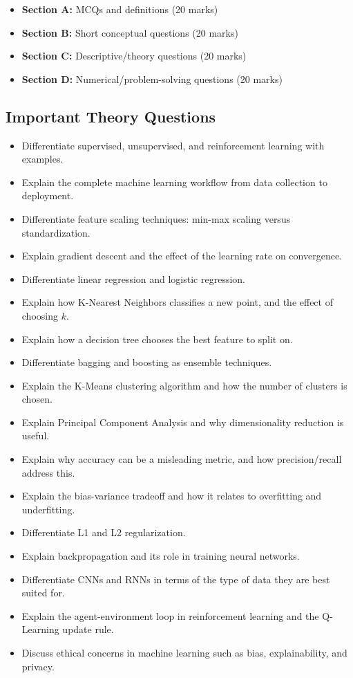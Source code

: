 \documentclass[11pt,a4paper]{article}
\begin{document}
\begin{conceptbox}
\begin{itemize}[leftmargin=*]
  \item \textbf{Section A:} MCQs and definitions (20 marks)
  \item \textbf{Section B:} Short conceptual questions (20 marks)
  \item \textbf{Section C:} Descriptive/theory questions (20 marks)
  \item \textbf{Section D:} Numerical/problem-solving questions (20 marks)
\end{itemize}
\end{conceptbox}

\subsection{Important Theory Questions}
\begin{itemize}[leftmargin=*]
  \item Differentiate supervised, unsupervised, and reinforcement learning with examples.
  \item Explain the complete machine learning workflow from data collection to deployment.
  \item Differentiate feature scaling techniques: min-max scaling versus standardization.
  \item Explain gradient descent and the effect of the learning rate on convergence.
  \item Differentiate linear regression and logistic regression.
  \item Explain how K-Nearest Neighbors classifies a new point, and the effect of choosing $k$.
  \item Explain how a decision tree chooses the best feature to split on.
  \item Differentiate bagging and boosting as ensemble techniques.
  \item Explain the K-Means clustering algorithm and how the number of clusters is chosen.
  \item Explain Principal Component Analysis and why dimensionality reduction is useful.
  \item Explain why accuracy can be a misleading metric, and how precision/recall address this.
  \item Explain the bias-variance tradeoff and how it relates to overfitting and underfitting.
  \item Differentiate L1 and L2 regularization.
  \item Explain backpropagation and its role in training neural networks.
  \item Differentiate CNNs and RNNs in terms of the type of data they are best suited for.
  \item Explain the agent-environment loop in reinforcement learning and the Q-Learning update rule.
  \item Discuss ethical concerns in machine learning such as bias, explainability, and privacy.
\end{itemize}
\end{document}
